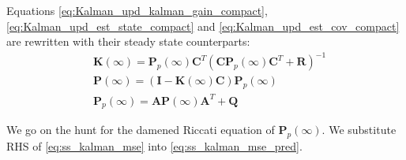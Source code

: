 Equations \cref{eq:Kalman_upd_kalman_gain_compact}, \cref{eq:Kalman_upd_est_state_compact} and \cref{eq:Kalman_upd_est_cov_compact} are rewritten with their steady state counterparts:
\begin{align}
	& \textbf{K}(\infty) = \textbf{P}_p(\infty) \textbf{C}^T (\textbf{C} \textbf{P}_p	(\infty) \textbf{C}^T + \textbf{R})^{-1} \label{eq:ss_kalman_kalman_gain} \\
	& \textbf{P}(\infty) = (\textbf{I} - \textbf{K}(\infty) \textbf{C}) \textbf{P}_p(\infty) \label{eq:ss_kalman_mse} \\
	& \textbf{P}_p(\infty) = \textbf{A}\textbf{P}(\infty)\textbf{A}^T + \textbf{Q} \label{eq:ss_kalman_mse_pred}
\end{align}

We go on the hunt for the damened Riccati equation of $\textbf{P}_p(\infty)$. We substitute RHS of \cref{eq:ss_kalman_mse} into \cref{eq:ss_kalman_mse_pred}.

